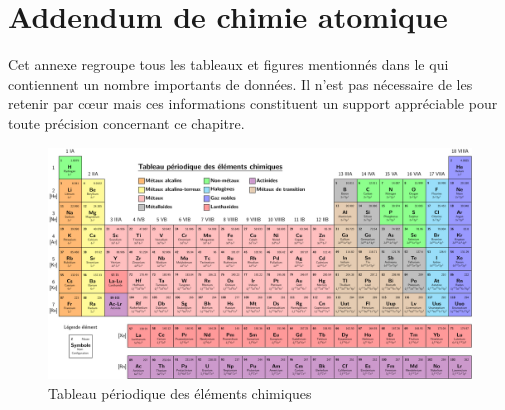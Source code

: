\chapter{Addendum de chimie atomique}
\label{ann:addendum_chimie_atomique}

Cet annexe regroupe tous les tableaux et figures mentionnés dans le  qui contiennent un nombre importants de données. Il n'est pas nécessaire de les retenir par c\oe{}ur mais ces informations constituent un support appréciable pour toute précision concernant ce chapitre.



\begin{landscape}
	\begin{figure}
	\caption{Tableau périodique des éléments chimiques}
	\label{tab:tableau_periodique}
		\begin{center}
			\includegraphics[scale=1.15]{tab_tableau_periodique.pdf} 
		\end{center}
	\end{figure}
\end{landscape}

